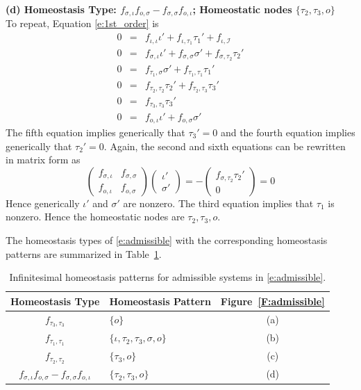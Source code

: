\documentclass[a4paper,fleqn]{cas-dc}
\newcommand{\II}{{\mathcal I}}
\begin{document}
\medskip

\noindent
\textbf{(d) Homeostasis Type: $f_{\sigma,\iota} f_{o,\sigma} - f_{\sigma,\sigma} f_{o,\iota} $; Homeostatic nodes $\{\tau_2, \tau_3, o\}$} \\
To repeat, Equation \eqref{e:1st_order} is
\begin{equation}  \label{e:1st_orderD}
\begin{array}{rcl}
0 & = & f_{\iota,\iota}\iota' + f_{\iota,\tau_1}\tau_1' + f_{\iota,\II} \\
0 & = & f_{\sigma,\iota}\iota' + f_{\sigma,\sigma}\sigma' + f_{\sigma,\tau_2}\tau_2' \\
0 & = & f_{\tau_1,\sigma}\sigma' + f_{\tau_1,\tau_1}\tau_1' \\
0 & = & f_{\tau_2,\tau_2}\tau_2' + f_{\tau_2,\tau_3}\tau_3' \\
0 & = & f_{\tau_3,\tau_3}\tau_3'\\
0 & = & f_{o,\iota}\iota' + f_{o,\sigma}\sigma'
\end{array}
\end{equation}
The fifth equation implies generically that $\tau_3' = 0$ and the fourth equation implies generically that $\tau_2' = 0$. Again, the second and sixth equations can be rewritten in matrix form as
\[
\begin{pmatrix}
f_{\sigma,\iota} &  f_{\sigma,\sigma} \\  f_{o,\iota} & f_{o,\sigma}
\end{pmatrix}
\begin{pmatrix}
\iota'  \\ \sigma'
\end{pmatrix}
= -\begin{pmatrix}
f_{\sigma,\tau_2}\tau_2' \\ 0
\end{pmatrix} = 0
\]
Hence generically $\iota'$ and $\sigma'$ are nonzero. The third equation implies that $\tau_1$ is nonzero.  Hence the homeostatic nodes are $\tau_2,\tau_3,o$.

The homeostasis types of \eqref{e:admissible} with the corresponding homeostasis patterns are summarized in Table~\ref{T:example8}.

\begin{table}[htb]
\caption{Infinitesimal homeostasis patterns for admissible systems in \eqref{e:admissible}.}
\label{T:example8} 
\begin{tabular}{clc}
\toprule
Homeostasis Type & Homeostasis Pattern &  Figure~\ref{F:admissible} \\
\midrule
$f_{\tau_3,\tau_3}$ & $\{o\}$ & (a)  \\
$f_{\tau_1,\tau_1}$ & $\{\iota,\tau_2,\tau_3,\sigma,o\}$ & (b) \\
$f_{\tau_2,\tau_2}$ & $\{\tau_3,o\}$ & (c) \\
$f_{\sigma,\iota} f_{o,\sigma} - f_{\sigma,\sigma} f_{o,\iota}$ & $\{\tau_2,\tau_3,o\}$ & (d) \\
\bottomrule
\end{tabular}
\end{table}
\end{document}
